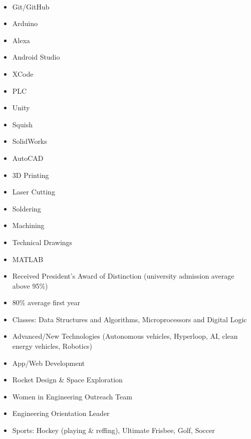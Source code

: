 \\
\begin{multicols}{2}
    \begin{itemize}
    	\item Git/GitHub
      	\item Arduino
		\item Alexa
      	\item Android Studio
      	\item XCode
		\item PLC
      	\item Unity
      	\item Squish
      	\item SolidWorks
      	\item AutoCAD
      	\item 3D Printing
      	\item Laser Cutting
      	\item Soldering
      	\item Machining
      	\item Technical Drawings
      	\item MATLAB
    \end{itemize}
\end{multicols}
\medskip

\begin{itemize}
\item Received President's Award of Distinction (university admission average above 95\%)
\item 80\%\+ average first year
\item Classes: Data Structures and Algorithms, Microprocessors and Digital Logic
\end{itemize}
\bigskip

\begin{itemize}
\item Advanced/New Technologies (Autonomous vehicles, Hyperloop, AI, clean energy vehicles, Robotics)
\item App/Web Development
\item Rocket Design \& Space Exploration
\item Women in Engineering Outreach Team
\item Engineering Orientation Leader
\item Sports: Hockey (playing \& reffing), Ultimate Frisbee, Golf, Soccer
\end{itemize}